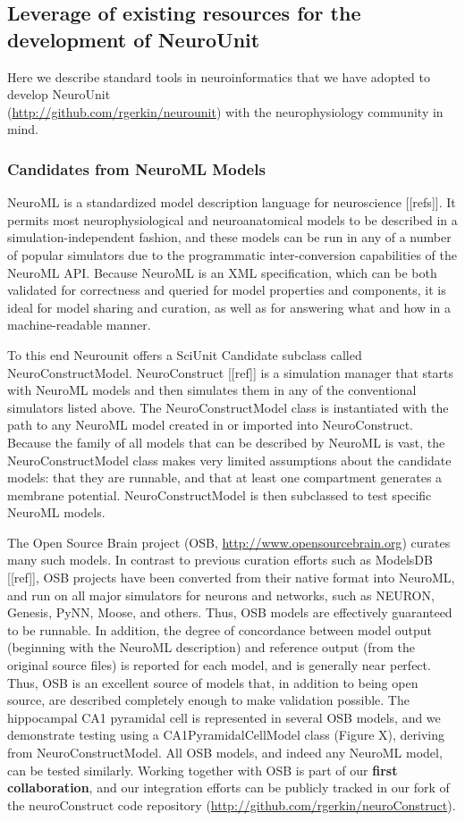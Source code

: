\documentclass[11pt,letterpaper]{article}
\begin{document}
\subsection{Leverage of existing resources for the development of NeuroUnit}
Here we describe standard tools in neuroinformatics that we have adopted to develop NeuroUnit 
\\(\url{http://github.com/rgerkin/neurounit}) with the neurophysiology community in mind.  

\subsubsection{Candidates from NeuroML Models}
NeuroML is a standardized model description language for neuroscience [[refs]].  It permits most neurophysiological and neuroanatomical models to be described in a simulation-independent fashion, and these models can be run in any of a number of popular simulators due to the programmatic inter-conversion capabilities of the NeuroML API.  Because NeuroML is an XML specification, which can be both validated for correctness and queried for model properties and components, it is ideal for model sharing and curation, as well as for answering what and how in a machine-readable manner.  

To this end Neurounit offers a SciUnit Candidate subclass called NeuroConstructModel. NeuroConstruct [[ref]] is a simulation manager that starts with NeuroML models and then simulates them in any of the conventional simulators listed above. The NeuroConstructModel class is instantiated with the path to any NeuroML model created in or imported into NeuroConstruct.  Because the family of all models that can be described by NeuroML is vast, the NeuroConstructModel class makes very limited assumptions about the candidate models: that they are runnable, and that at least one compartment generates a membrane potential. NeuroConstructModel is then subclassed to test specific NeuroML models. 

The Open Source Brain project (OSB, \url{http://www.opensourcebrain.org}) curates many such models. In contrast to previous curation efforts such as ModelsDB [[ref]], OSB projects have been converted from their native format into NeuroML, and run on all major simulators for neurons and networks, such as NEURON, Genesis, PyNN, Moose, and others. Thus, OSB models are effectively guaranteed to be runnable.  In addition, the degree of concordance between model output (beginning with the NeuroML description) and reference output (from the original source files) is reported for each model, and is generally near perfect.  Thus, OSB is an excellent source of models that, in addition to being open source, are described completely enough to make validation possible.   The hippocampal CA1 pyramidal cell is represented in several OSB models, and we demonstrate testing using a CA1PyramidalCellModel class (Figure X), deriving from NeuroConstructModel.  All OSB models, and indeed any NeuroML model, can be tested similarly.  Working together with OSB is part of our \textbf{first collaboration}, and our integration efforts can be publicly tracked in our fork of the neuroConstruct code repository (\url{http://github.com/rgerkin/neuroConstruct}).  
\end{document}
